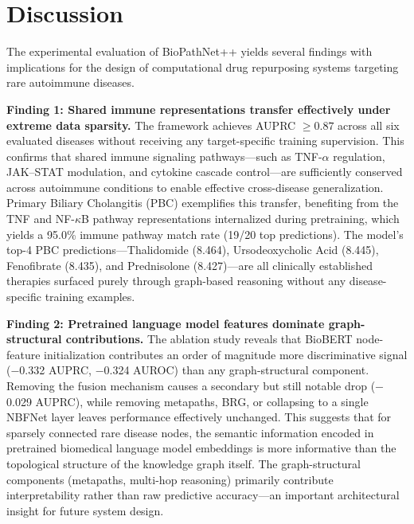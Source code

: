 \documentclass[conference]{IEEEtran}
\begin{document}
\section{Discussion}

The experimental evaluation of BioPathNet++ yields several findings with implications for the design of computational drug repurposing systems targeting rare autoimmune diseases.

\textbf{Finding 1: Shared immune representations transfer effectively under extreme data sparsity.} The framework achieves AUPRC $\geq 0.87$ across all six evaluated diseases without receiving any target-specific training supervision. This confirms that shared immune signaling pathways---such as TNF-$\alpha$ regulation, JAK--STAT modulation, and cytokine cascade control---are sufficiently conserved across autoimmune conditions to enable effective cross-disease generalization. Primary Biliary Cholangitis (PBC) exemplifies this transfer, benefiting from the TNF and NF-$\kappa$B pathway representations internalized during pretraining, which yields a 95.0\% immune pathway match rate (19/20 top predictions). The model's top-4 PBC predictions---Thalidomide (8.464), Ursodeoxycholic Acid (8.445), Fenofibrate (8.435), and Prednisolone (8.427)---are all clinically established therapies surfaced purely through graph-based reasoning without any disease-specific training examples.

\textbf{Finding 2: Pretrained language model features dominate graph-structural contributions.} The ablation study reveals that BioBERT node-feature initialization contributes an order of magnitude more discriminative signal ($-$0.332 AUPRC, $-$0.324 AUROC) than any graph-structural component. Removing the fusion mechanism causes a secondary but still notable drop ($-$0.029 AUPRC), while removing metapaths, BRG, or collapsing to a single NBFNet layer leaves performance effectively unchanged. This suggests that for sparsely connected rare disease nodes, the semantic information encoded in pretrained biomedical language model embeddings is more informative than the topological structure of the knowledge graph itself. The graph-structural components (metapaths, multi-hop reasoning) primarily contribute interpretability rather than raw predictive accuracy---an important architectural insight for future system design.
\end{document}
